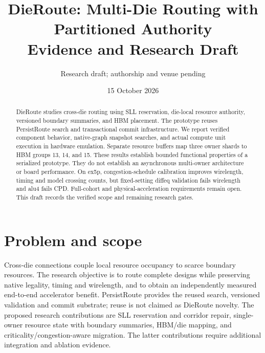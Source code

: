 \documentclass[10pt]{article}
\title{DieRoute: Multi-Die Routing with Partitioned Authority\\\large Evidence and Research Draft}
\author{Research draft; authorship and venue pending}
\date{15 October 2026}
\begin{document}
\maketitle
\begin{abstract}
DieRoute studies cross-die routing using SLL reservation, die-local resource
authority, versioned boundary summaries, and HBM placement. The prototype
reuses PersistRoute search and transactional commit infrastructure. We report
verified component behavior, native-graph snapshot searches, and actual compute
unit execution in hardware emulation. Separate resource buffers map three
owner shards to HBM groups 13, 14, and 15. These results establish bounded
functional properties of a serialized prototype. They do not establish an
asynchronous multi-owner architecture or board performance. On ex5p,
congestion-schedule calibration improves wirelength, timing and model crossing
counts, but fixed-setting diffeq validation fails wirelength and alu4 fails CPD. Full-cohort and
physical-acceleration requirements remain open.
This draft records the verified scope and remaining research gates.
\end{abstract}

\section{Problem and scope}
Cross-die connections couple local resource occupancy to scarce boundary
resources. The research objective is to route complete designs while preserving
native legality, timing and wirelength, and to obtain an independently measured
end-to-end accelerator benefit. PersistRoute provides the reused search,
versioned validation and commit substrate; reuse is not claimed as DieRoute
novelty. The proposed research contributions are SLL reservation and corridor
repair, single-owner resource state with boundary summaries, HBM/die mapping,
and criticality/congestion-aware migration. The latter contributions require
additional integration and ablation evidence.
\end{document}
